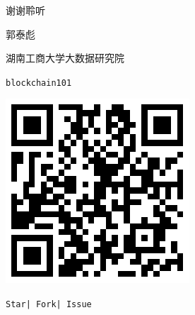 \documentclass[11pt]{beamer}
\begin{document}
\begin{frame}
	\begin{minipage}[t]{0.5\linewidth}
		\begin{center}
			\begin{figure}
				\vspace{10pt}

				{\Huge 谢谢聆听}

				\vspace{30pt}
				郭泰彪

				\vspace{10pt}
				湖南工商大学大数据研究院
			\end{figure}
			\begin{figure}

			\end{figure}
		\end{center}
	\end{minipage}%
	\begin{minipage}[t]{0.4\linewidth}
		\begin{figure}
			\centering
			\texttt{blockchain101}

			\includegraphics[width=0.6\linewidth]{figures/blockchain101qrcode}

			{\footnotesize \texttt{Star| Fork| Issue}}
		\end{figure}
	\end{minipage}%
\end{frame}
\end{document}
